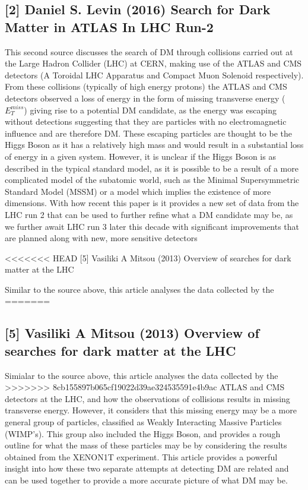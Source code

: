 \documentclass[]{article}
\begin{document}
\subsection*{[2] Daniel S. Levin (2016) Search for Dark Matter in ATLAS In LHC Run-2}
\parskip 0.2cm
This second source discusses the search of DM through collisions carried out at the Large 
Hadron Collider (LHC) at CERN, making use of the ATLAS and CMS detectors 
(A Toroidal LHC Apparatus and Compact Muon Solenoid respectively).
From these collisions (typically of high energy protons) the ATLAS and CMS detectors
observed a loss of energy in the form of missing transverse energy ($E^{miss}_{T} $)
giving rise to a potential DM candidate, as the energy was escaping without 
detections suggesting that they are particles with no electromagnetic influence 
and are therefore DM. These escaping particles are thought to be the Higgs Boson 
as it has a relatively high mass and would result in a substantial loss of energy
in a given system. However, it is unclear if the Higgs Boson is as 
described in the typical standard model, as it is possible to be a result of a more 
complicated model of the subatomic world, such as the Minimal Supersymmetric Standard Model (MSSM)
or a model which implies the existence of more dimensions. With how recent this paper 
is it provides a new set of data from the LHC run 2 that can be used to further refine 
what a DM candidate may be, as we further await LHC run 3 later this decade with 
significant improvements that are planned along with new, more sensitive detectors\parskip 0.2cm 

\noindent 
<<<<<<< HEAD
 [5] Vasiliki A Mitsou (2013) Overview of searches for dark matter at the LHC
\par
Similar to the source above, this article analyses the data collected by the
=======
\subsection*{[5] Vasiliki A Mitsou (2013) Overview of searches for dark matter at the LHC}
\parskip 0.2cm
Simialar to the source above, this article analyses the data collected by the
>>>>>>> 8cb155897b065cf19022d39ae324535591e4b9ac
ATLAS and CMS detectors at the LHC, and how the observations of collisions results in
missing transverse energy. However, it considers that this missing energy may be
a more general group of particles, classified as Weakly Interacting Massive Particles (WIMP's).
This group also included the Higgs Boson, and provides a rough outline for what 
the mass of these particles may be by considering the results obtained 
from the XENON1T experiment. This article provides a powerful insight into how these
two separate attempts at detecting DM are related and can be used together 
to provide a more accurate picture of what DM may be.
\end{document}
